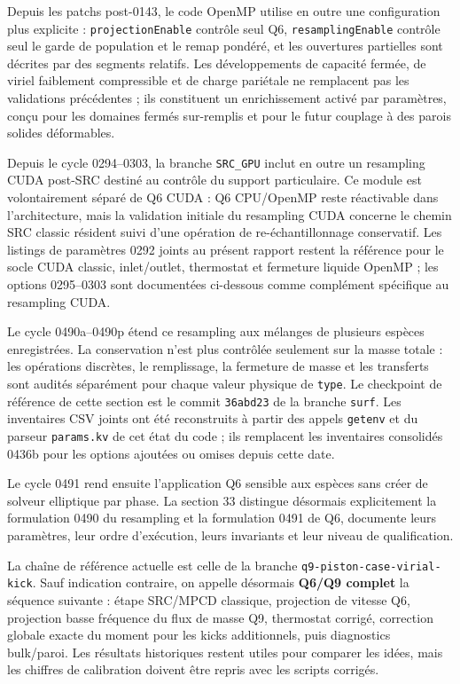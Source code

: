 \documentclass[11pt,a4paper]{article}
\begin{document}
Depuis les patchs post-0143, le code OpenMP utilise en outre une configuration plus explicite : \texttt{projectionEnable} contrôle seul Q6, \texttt{resamplingEnable} contrôle seul le garde de population et le remap pondéré, et les ouvertures partielles sont décrites par des segments relatifs. Les développements de capacité fermée, de viriel faiblement compressible et de charge pariétale ne remplacent pas les validations précédentes ; ils constituent un enrichissement activé par paramètres, conçu pour les domaines fermés sur-remplis et pour le futur couplage à des parois solides déformables.


Depuis le cycle 0294--0303, la branche \texttt{SRC\_GPU} inclut en outre un resampling CUDA post-SRC destiné au contrôle du support particulaire. Ce module est volontairement séparé de Q6 CUDA : Q6 CPU/OpenMP reste réactivable dans l'architecture, mais la validation initiale du resampling CUDA concerne le chemin SRC classic résident suivi d'une opération de re-échantillonnage conservatif. Les listings de paramètres 0292 joints au présent rapport restent la référence pour le socle CUDA classic, inlet/outlet, thermostat et fermeture liquide OpenMP ; les options 0295--0303 sont documentées ci-dessous comme complément spécifique au resampling CUDA.


Le cycle 0490a--0490p étend ce resampling aux mélanges de plusieurs espèces enregistrées. La conservation n'est plus contrôlée seulement sur la masse totale : les opérations discrètes, le remplissage, la fermeture de masse et les transferts sont audités séparément pour chaque valeur physique de \texttt{type}. Le checkpoint de référence de cette section est le commit \texttt{36abd23} de la branche \texttt{surf}. Les inventaires CSV joints ont été reconstruits à partir des appels \texttt{getenv} et du parseur \texttt{params.kv} de cet état du code ; ils remplacent les inventaires consolidés 0436b pour les options ajoutées ou omises depuis cette date.

Le cycle 0491 rend ensuite l'application Q6 sensible aux espèces sans créer de solveur elliptique par phase. La section 33 distingue désormais explicitement la formulation 0490 du resampling et la formulation 0491 de Q6, documente leurs paramètres, leur ordre d'exécution, leurs invariants et leur niveau de qualification.

La chaîne de référence actuelle est celle de la branche \texttt{q9-piston-case-virial-kick}. Sauf indication contraire, on appelle désormais \textbf{Q6/Q9 complet} la séquence suivante : étape SRC/MPCD classique, projection de vitesse Q6, projection basse fréquence du flux de masse Q9, thermostat corrigé, correction globale exacte du moment pour les kicks additionnels, puis diagnostics bulk/paroi. Les résultats historiques restent utiles pour comparer les idées, mais les chiffres de calibration doivent être repris avec les scripts corrigés.
\end{document}
